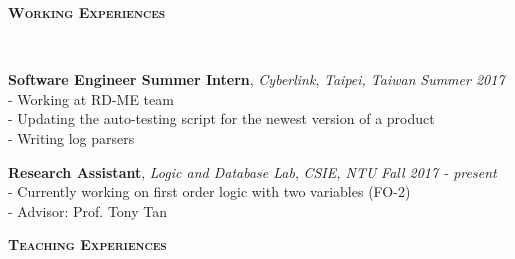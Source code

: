 \documentclass[10pt]{article}
\newenvironment{changemargin}[2]{%
  \begin{list}{}{%
    \setlength{\topsep}{0pt}%
    \setlength{\leftmargin}{#1}%
    \setlength{\rightmargin}{#2}%
    \setlength{\listparindent}{\parindent}%
    \setlength{\itemindent}{\parindent}%
    \setlength{\parsep}{\parskip}%
  }%
  \item[]}{\end{list}
}
\newcommand{\lineover}{
	\begin{changemargin}{-0.05in}{-0.05in}
		\vspace*{-8pt}
		\hrulefill \\
		\vspace*{-2pt}
	\end{changemargin}
}
\newcommand{\header}[1]{
	\begin{changemargin}{-0.5in}{-0.5in}
		\large{\bf \scshape{#1}}\\
  	\lineover
	\end{changemargin}
}
\newenvironment{body} {
	\vspace*{-16pt}
	\begin{changemargin}{-0.25in}{-0.5in}
  }	
	{\end{changemargin}
}
\begin{document}
\smallskip

\header{Working Experiences}

\begin{body}
	\vspace{14pt}

	\textbf {Software Engineer Summer Intern}, {\textit{Cyberlink}}, \emph{Taipei, Taiwan} \hfill \emph{Summer 2017}\\
	\hspace{12pt} - Working at RD-ME team\\
\fi
	\hspace{12pt} - Updating the auto-testing script for the newest version of a product\\
	\hspace{12pt} - Writing log parsers
	\smallskip
	
	\textbf {Research Assistant}, {\textit{Logic and Database Lab}}, \emph{CSIE, NTU} \hfill \emph{Fall 2017 - present}\\
	\hspace{12pt} - Currently working on first order logic with two variables (FO-2)\\
	\hspace{12pt} - Advisor: Prof. Tony Tan
	\smallskip
	
\end{body}

\smallskip

\header{Teaching Experiences}
\end{document}
